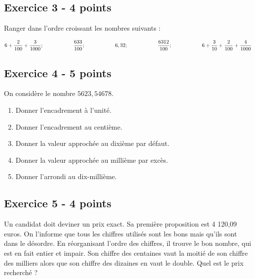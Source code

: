 \documentclass[12 pt]{extarticle}
\theoremstyle{plain}
\begin{document}
 \subsection*{Exercice 3 - 4 points}
 
 Ranger dans l'ordre croissant les nombres suivants : 
 
 \[ 
 6 + \frac{2}{100} + \frac{3}{1000}; \hspace{2 cm}
 \frac{633}{100}; \hspace{2 cm}
 6,32    ; \hspace{2 cm}
 \frac{6312}{100} ; \hspace{2 cm}
 6 + \frac3{10} + \frac2{100} + \frac4{1000}
 \]
 
 \subsection*{Exercice 4 - 5 points}
 
 On considère le nombre $5 623, 546 78$. \begin{enumerate}
 \item Donner l'encadrement à l'unité. 
 \item Donner l'encadrement au centième. 
 \item Donner la valeur approchée au dixième par défaut. 
 \item Donner la valeur approchée au millième par excès. 
 \item Donner l'arrondi au dix-millième. 
 \end{enumerate}
 
 \subsection*{Exercice 5 - 4 points}
 Un candidat doit deviner un prix exact. 
Sa première proposition est 4 120,09 euros.
On l'informe que tous les chiffres utilisés sont les bons mais qu'ils sont dans le désordre. En réorganisant l'ordre des chiffres, il trouve le bon nombre,
qui est en fait entier et impair.
Son chiffre des centaines vaut la moitié de son chiffre des milliers alors que son chiffre des dizaines en vaut le double. Quel est le prix recherché ?
 	
\end{document}
